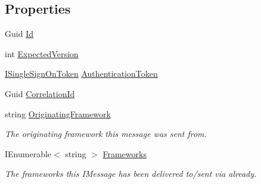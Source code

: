 \subsection*{Properties}
\begin{DoxyCompactItemize}
\item 
Guid \hyperlink{classCqrs_1_1Tests_1_1Substitutes_1_1TestAggregateDoSomething_a950bfb7b4388202574f05f0d1408efc0_a950bfb7b4388202574f05f0d1408efc0}{Id}
\item 
int \hyperlink{classCqrs_1_1Tests_1_1Substitutes_1_1TestAggregateDoSomething_a4bfa4361b02c9feb80228dd97810335f_a4bfa4361b02c9feb80228dd97810335f}{Expected\+Version}
\item 
\hyperlink{interfaceCqrs_1_1Authentication_1_1ISingleSignOnToken}{I\+Single\+Sign\+On\+Token} \hyperlink{classCqrs_1_1Tests_1_1Substitutes_1_1TestAggregateDoSomething_a8048b53eb7e8b0a889a1fa3c4b28df28_a8048b53eb7e8b0a889a1fa3c4b28df28}{Authentication\+Token}
\item 
Guid \hyperlink{classCqrs_1_1Tests_1_1Substitutes_1_1TestAggregateDoSomething_ac99d22fe7557e2d0acecc18fc9028a09_ac99d22fe7557e2d0acecc18fc9028a09}{Correlation\+Id}
\item 
string \hyperlink{classCqrs_1_1Tests_1_1Substitutes_1_1TestAggregateDoSomething_ade0f64f6351140f158eddbad9984e5b6_ade0f64f6351140f158eddbad9984e5b6}{Originating\+Framework}
\begin{DoxyCompactList}\small\item\em The originating framework this message was sent from. \end{DoxyCompactList}\item 
I\+Enumerable$<$ string $>$ \hyperlink{classCqrs_1_1Tests_1_1Substitutes_1_1TestAggregateDoSomething_a4fbb987df0218d50792d1694de789d8b_a4fbb987df0218d50792d1694de789d8b}{Frameworks}
\begin{DoxyCompactList}\small\item\em The frameworks this I\+Message has been delivered to/sent via already. \end{DoxyCompactList}\end{DoxyCompactItemize}


